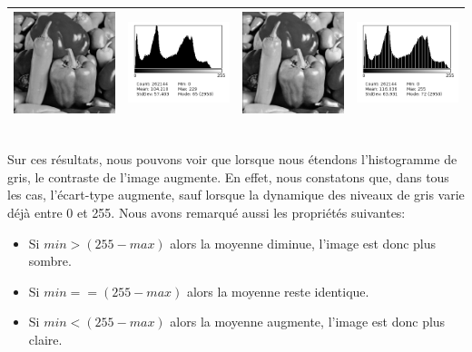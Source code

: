 \documentclass[a4paper,11pt]{article}
\begin{document}
\begin{tabular}{|c|c|c|c|}
   \hline
   \includegraphics[width=3cm]{peppers.png} & \includegraphics[width=3cm]{../histo/image/hist_peppers.png} & \includegraphics[width=3cm]{../res/peppersQ1.png} & \includegraphics[width=3cm]{../histo/resultat/hist_peppersQ1.png}\\
   \hline
  \end{tabular}\\
  
  Sur ces résultats, nous pouvons voir que lorsque nous étendons l'histogramme de gris, le 
  contraste de l'image augmente. En effet, nous constatons que, dans tous les cas, l'écart-type 
  augmente, sauf lorsque la dynamique des niveaux de gris varie déjà entre 0 et 255. Nous 
  avons remarqué aussi les propriétés suivantes:
  
  \begin{itemize}
   \item Si $min>(255-max)$ alors la moyenne diminue, l'image est donc plus sombre.
   \item Si $min==(255-max)$ alors la moyenne reste identique.
   \item Si $min<(255-max)$ alors la moyenne augmente, l'image est donc plus claire.
  \end{itemize}
  
\end{document}
